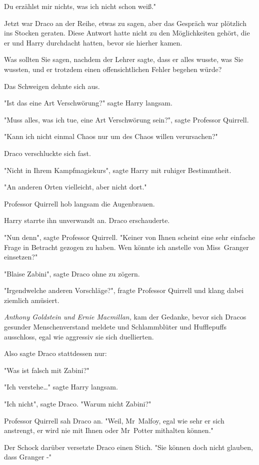 {Du erzählst mir nichts, was ich nicht schon weiß."

Jetzt war Draco an der Reihe, etwas zu sagen, aber das Gespräch war plötzlich ins Stocken geraten. Diese Antwort hatte nicht zu den Möglichkeiten gehört, die er und Harry durchdacht hatten, bevor sie hierher kamen.

Was sollten Sie sagen, nachdem der Lehrer sagte, dass er alles wusste, was Sie wussten, und er trotzdem einen offensichtlichen Fehler begehen würde?

Das Schweigen dehnte sich aus.

"Ist das eine Art Verschwörung?" sagte Harry langsam.

"Muss alles, was ich tue, eine Art Verschwörung sein?", sagte Professor Quirrell.

"Kann ich nicht einmal Chaos nur um des Chaos willen verursachen?"

Draco verschluckte sich fast.

"Nicht in Ihrem Kampfmagiekurs", sagte Harry mit ruhiger Bestimmtheit.

"An anderen Orten vielleicht, aber nicht dort."

Professor Quirrell hob langsam die Augenbrauen.

Harry starrte ihn unverwandt an. Draco erschauderte.

"Nun denn", sagte Professor Quirrell. "Keiner von Ihnen scheint eine sehr einfache Frage in Betracht gezogen zu haben. Wen könnte ich anstelle von Miss~Granger einsetzen?"

"Blaise Zabini", sagte Draco ohne zu zögern.

"Irgendwelche anderen Vorschläge?", fragte Professor Quirrell und klang dabei ziemlich amüsiert.

\emph{Anthony Goldstein und Ernie Macmillan,} kam der Gedanke, bevor sich Dracos gesunder Menschenverstand meldete und Schlammblüter und Hufflepuffs ausschloss, egal wie aggressiv sie sich duellierten.

Also sagte Draco stattdessen nur:

"Was ist falsch mit Zabini?"

"Ich verstehe…" sagte Harry langsam.

"Ich nicht", sagte Draco. "Warum nicht Zabini?"

Professor Quirrell sah Draco an. "Weil, Mr~Malfoy, egal wie sehr er sich anstrengt, er wird nie mit Ihnen oder Mr~Potter mithalten können."

Der Schock darüber versetzte Draco einen Stich. "Sie können doch nicht glauben, dass Granger -"

}
